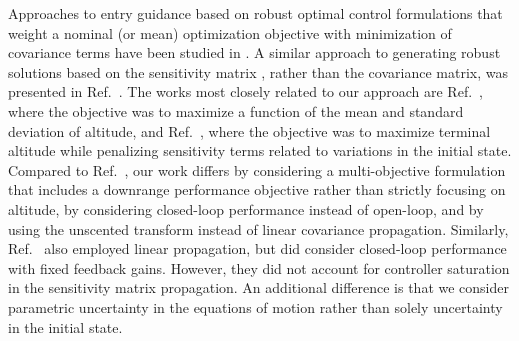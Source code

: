 \documentclass[journal ]{new-aiaa}
\begin{document}

Approaches to entry guidance based on robust optimal control formulations that weight a nominal (or mean) optimization objective with minimization of covariance terms have been studied in \cite{AltitudeUnderUncertainty, EntryOUUThesis1, EntryOUUThesis2, EntryOUU}. A similar approach to generating robust solutions based on the sensitivity matrix \cite{Desensitized}, rather than the covariance matrix, was presented in Ref.~\cite{MarsEntryDesensitized}. 
The works most closely related to our approach are Ref.~\cite{AltitudeUnderUncertainty}, where the objective was to maximize a function of the mean and standard deviation of altitude, and Ref.~\cite{MarsEntryDesensitized}, where the objective was to maximize terminal altitude while penalizing sensitivity terms related to variations in the initial state. Compared to Ref.~\cite{AltitudeUnderUncertainty}, our work differs by considering a multi-objective formulation that includes a downrange performance objective rather than strictly focusing on altitude, by considering closed-loop performance instead of open-loop, and by using the unscented transform instead of linear covariance propagation. Similarly, Ref.~\cite{MarsEntryDesensitized} also employed linear propagation, but did consider closed-loop performance with fixed feedback gains. However, they did not account for controller saturation in the sensitivity matrix propagation. An additional difference is that we consider parametric uncertainty in the equations of motion rather than solely uncertainty in the initial state. 

\end{document}
